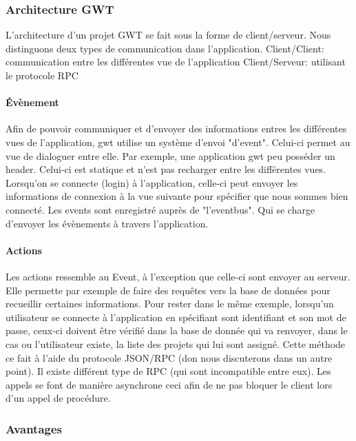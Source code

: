 \subsubsection{Architecture GWT}
L'architecture d'un projet GWT se fait sous la forme de client/serveur. Nous distinguons deux types de communication dans l'application.
Client/Client: communication entre les différentes vue de l'application
Client/Serveur: utilisant le protocole RPC 

\paragraph{Évènement}
Afin de pouvoir communiquer et d'envoyer des informations entres les différentes vues de l'application, gwt utilise un système d'envoi "d'event". Celui-ci permet au vue de dialoguer entre elle.
Par exemple, une application gwt peu posséder un header. Celui-ci est statique et n'est pas recharger entre les différentes vues. Lorsqu'on se connecte (login) à l'application, celle-ci peut envoyer les informations de connexion à la vue suivante pour spécifier que nous sommes bien connecté.
Les events sont enregistré auprès de "l'eventbus". Qui se charge d'envoyer les évènements à travers l'application.

\paragraph{Actions}
Les actions ressemble au Event, à l'exception que celle-ci sont envoyer au serveur. Elle permette par exemple de faire des requêtes vers la base de données pour recueillir certaines informations. Pour rester dans le même exemple, lorsqu'un utilisateur se connecte à l'application en spécifiant sont identifiant et son mot de passe, ceux-ci doivent être vérifié dans la base de donnée qui va renvoyer, dans le cas ou l'utilisateur existe, la liste des projets qui lui sont assigné. Cette méthode ce fait à l'aide du protocole JSON/RPC (don nous discuterons dans un autre point). Il existe différent type de RPC (qui sont incompatible entre eux). Les appels se font de manière asynchrone ceci afin de ne pas bloquer le client lors d'un appel de procédure.
	
\subsubsection{Avantages}

